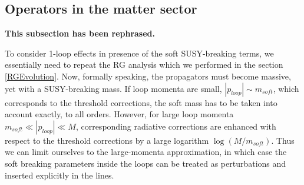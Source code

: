 \documentclass[12pt]{revtex4}
\begin{document}







\subsection{Operators in the matter sector}

	{\bf This subsection has been rephrased.}

	To consider 1-loop effects in presence of the soft SUSY-breaking terms, 
	we essentially need to repeat the RG analysis which we performed in
	the section \ref{RGEvolution}.
	Now, formally speaking, the propagators must become massive, yet with a SUSY-breaking
	mass. 
	If loop momenta are small, $|p_{loop}| \sim m_{soft}$, which corresponds to the 
	threshold corrections,
 	the soft mass has to be taken into account exactly, to all orders.
	However, for large loop momenta
$ m_{soft} \ll |p_{loop}|\ll M $,
	corresponding radiative corrections 
	are enhanced with respect to the threshold corrections by a large logarithm
$\log(M/m_{soft})$.
	Thus we can limit ourselves to the large-momenta approximation, in which case
	the soft breaking parameters inside the loops can be treated as perturbations
	and inserted explicitly in the lines.
\end{document}
